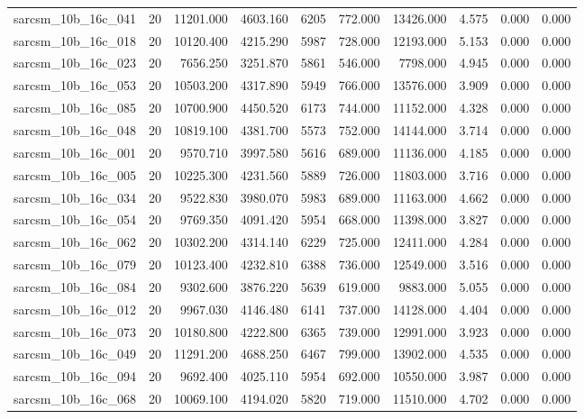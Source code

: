 \begin{tabular}{lrrrrrrrrr}
sarcsm\_10b\_16c\_041 & 20 & 11201.000 & 4603.160 & 6205 & 772.000 & 13426.000 & 4.575 & 0.000 & 0.000 \\
sarcsm\_10b\_16c\_018 & 20 & 10120.400 & 4215.290 & 5987 & 728.000 & 12193.000 & 5.153 & 0.000 & 0.000 \\
sarcsm\_10b\_16c\_023 & 20 & 7656.250 & 3251.870 & 5861 & 546.000 & 7798.000 & 4.945 & 0.000 & 0.000 \\
sarcsm\_10b\_16c\_053 & 20 & 10503.200 & 4317.890 & 5949 & 766.000 & 13576.000 & 3.909 & 0.000 & 0.000 \\
sarcsm\_10b\_16c\_085 & 20 & 10700.900 & 4450.520 & 6173 & 744.000 & 11152.000 & 4.328 & 0.000 & 0.000 \\
sarcsm\_10b\_16c\_048 & 20 & 10819.100 & 4381.700 & 5573 & 752.000 & 14144.000 & 3.714 & 0.000 & 0.000 \\
sarcsm\_10b\_16c\_001 & 20 & 9570.710 & 3997.580 & 5616 & 689.000 & 11136.000 & 4.185 & 0.000 & 0.000 \\
sarcsm\_10b\_16c\_005 & 20 & 10225.300 & 4231.560 & 5889 & 726.000 & 11803.000 & 3.716 & 0.000 & 0.000 \\
sarcsm\_10b\_16c\_034 & 20 & 9522.830 & 3980.070 & 5983 & 689.000 & 11163.000 & 4.662 & 0.000 & 0.000 \\
sarcsm\_10b\_16c\_054 & 20 & 9769.350 & 4091.420 & 5954 & 668.000 & 11398.000 & 3.827 & 0.000 & 0.000 \\
sarcsm\_10b\_16c\_062 & 20 & 10302.200 & 4314.140 & 6229 & 725.000 & 12411.000 & 4.284 & 0.000 & 0.000 \\
sarcsm\_10b\_16c\_079 & 20 & 10123.400 & 4232.810 & 6388 & 736.000 & 12549.000 & 3.516 & 0.000 & 0.000 \\
sarcsm\_10b\_16c\_084 & 20 & 9302.600 & 3876.220 & 5639 & 619.000 & 9883.000 & 5.055 & 0.000 & 0.000 \\
sarcsm\_10b\_16c\_012 & 20 & 9967.030 & 4146.480 & 6141 & 737.000 & 14128.000 & 4.404 & 0.000 & 0.000 \\
sarcsm\_10b\_16c\_073 & 20 & 10180.800 & 4222.800 & 6365 & 739.000 & 12991.000 & 3.923 & 0.000 & 0.000 \\
sarcsm\_10b\_16c\_049 & 20 & 11291.200 & 4688.250 & 6467 & 799.000 & 13902.000 & 4.535 & 0.000 & 0.000 \\
sarcsm\_10b\_16c\_094 & 20 & 9692.400 & 4025.110 & 5954 & 692.000 & 10550.000 & 3.987 & 0.000 & 0.000 \\
sarcsm\_10b\_16c\_068 & 20 & 10069.100 & 4194.020 & 5820 & 719.000 & 11510.000 & 4.702 & 0.000 & 0.000 \\

\end{tabular}
